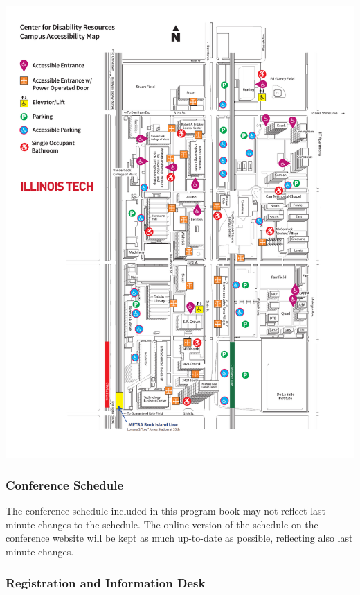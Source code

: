 \begin{center}
	\includegraphics[width = \textwidth] {Photos/mies-campus-accessibility-map-2022.pdf}
\end{center}




\subsubsection{Conference Schedule}

The conference schedule included in this program book may not reflect last-minute changes to the schedule. The online version of the schedule on the conference website
will be kept as much up-to-date as possible, reflecting also last minute changes. 

\subsubsection{Registration and Information Desk}

